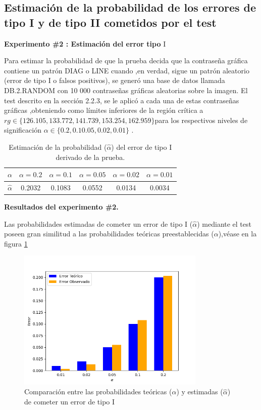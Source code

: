 \documentclass[12pt]{report}
\begin{document}
\subsection{Estimación de la probabilidad de los errores de tipo I y de tipo II  cometidos por el test}	 
\textbf{Experimento \#2 : Estimación del error tipo} I

Para estimar la probabilidad de que la prueba decida que la contraseña gráfica contiene un patrón DIAG o LINE cuando ,en verdad, sigue un patrón aleatorio (error de tipo I o falsos positivos), se generó una base de datos llamada DB.2.RANDOM con 10 000 contraseñas gráficas aleatorias sobre la imagen. El test descrito en la sección 2.2.3, se le aplicó a cada una de estas contraseñas gráficas ,obteniendo como límites inferiores de la región crítica a  $rg \in \{126.105, 133.772, 141.739, 153.254, 162.959\}$para los respectivos  niveles de significación $\alpha \in \{0.2, 0.1 0.05, 0.02 , 0.01\}$ .

\begin{table}[h!]
	\centering
	\begin{tabular}{|c|ccccc|}
		\hline
		$\alpha$ & $\alpha = 0.2$ & $\alpha = 0.1$ & $\alpha = 0.05$ & $\alpha = 0.02$ & $\alpha = 0.01$ \\
		\hline
		$\hat{\alpha}$ & 0.2032 & 0.1083 & 0.0552 & 0.0134 & 0.0034 \\
		\hline
	\end{tabular}
	\caption{Estimación de la probabilidad ($\hat{\alpha}$) del error de tipo I derivado de la prueba.}
	\label{tab3:error1-prob1}
\end{table}

\textbf{Resultados del experimento \#2.}

Las probabilidades estimadas de cometer un error de tipo I ($\hat{\alpha}$) mediante el test poseen gran similitud  a las probabilidades teóricas preestablecidas ($\alpha$),véase en la figura \ref{Teorico vs Observado2}
\begin{figure}[ht]
	\centering
	
	\includegraphics[width=0.8\textwidth]{4td_teo_obs.png}
	\caption{Comparación entre las probabilidades teóricas ($\alpha$) y estimadas ($\hat{\alpha}$) de cometer un error de tipo I }
	\label{Teorico vs Observado2}
\end{figure}\\
\end{document}
